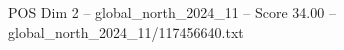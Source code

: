 \begin{textsample}{POS Dim 2 – global\_north\_2024\_11 – Score 34.00 – global\_north\_2024\_11/117456640.txt}
\end{textsample}
